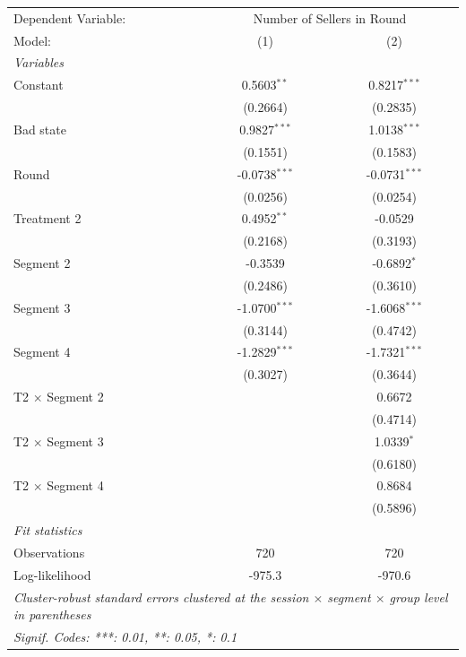 
\begingroup
\centering
\scriptsize
\begin{tabular}{lcc}
   \tabularnewline \midrule \midrule
   Dependent Variable: & \multicolumn{2}{c}{Number of Sellers in Round}\\
   Model:               & (1)  & (2)\\
   \midrule
   \emph{Variables}\\
   Constant                  & 0.5603$^{**}$ & 0.8217$^{***}$\\
                             & (0.2664) & (0.2835)\\
   Bad state                 & 0.9827$^{***}$ & 1.0138$^{***}$\\
                             & (0.1551) & (0.1583)\\
   Round                     & -0.0738$^{***}$ & -0.0731$^{***}$\\
                             & (0.0256) & (0.0254)\\
   Treatment 2               & 0.4952$^{**}$ & -0.0529\\
                             & (0.2168) & (0.3193)\\
   Segment 2                 & -0.3539 & -0.6892$^{*}$\\
                             & (0.2486) & (0.3610)\\
   Segment 3                 & -1.0700$^{***}$ & -1.6068$^{***}$\\
                             & (0.3144) & (0.4742)\\
   Segment 4                 & -1.2829$^{***}$ & -1.7321$^{***}$\\
                             & (0.3027) & (0.3644)\\
   T2 $\times$ Segment 2     &  & 0.6672\\
                             &  & (0.4714)\\
   T2 $\times$ Segment 3     &  & 1.0339$^{*}$\\
                             &  & (0.6180)\\
   T2 $\times$ Segment 4     &  & 0.8684\\
                             &  & (0.5896)\\
   \midrule
   \emph{Fit statistics}\\
   Observations              & 720 & 720\\
   Log-likelihood            & -975.3 & -970.6\\
   \midrule \midrule
   \multicolumn{3}{l}{\emph{Cluster-robust standard errors clustered at the session $\times$ segment $\times$ group level in parentheses}}\\
   \multicolumn{3}{l}{\emph{Signif. Codes: ***: 0.01, **: 0.05, *: 0.1}}\\
\end{tabular}
\par\endgroup


